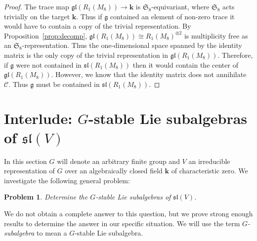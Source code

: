 \documentclass{amsart}
\newtheorem{proposition}[theorem]{Proposition}
\newtheorem{problem}[theorem]{Problem}
\theoremstyle{definition}
\theoremstyle{remark}
\DeclareMathOperator{\End}{End}
\def\SS{\mathfrak{S}}
\def\fieldk{\mathbf{k}}
\def\cubic{\mathcal{C}}
\let\mf\mathfrak
\begin{document}
\begin{proof}
The trace map $\mf{gl}(R_1(M_8)) \to \fieldk$ is $\SS_8$-equivariant, where $\SS_8$ acts trivially on the target
$\fieldk$.  Thus if $\mf{g}$ contained an element of non-zero trace it would have to contain a copy of the trivial
representation.  By Proposition~\ref{prop:decomp}, $\mf{gl}(R_1(M_8)) \cong R_1(M_8)^{\otimes 2}$ is multiplicity free
as an $\SS_8$-representation.  Thus the one-dimensional space spanned by the identity matrix is the only copy of the
trivial representation in $\mf{gl}(R_1(M_8))$.  Therefore, if $\mf{g}$ were not contained in $\mf{sl}(R_1(M_8))$ then
it would contain the center of $\mf{gl}(R_1(M_8))$.  However, we know that the identity matrix does not annihilate
$\cubic$.  Thus $\mf{g}$ must be contained in $\mf{sl}(R_1(M_8))$.
\end{proof}

%
%

\section{Interlude:  $G$-stable Lie subalgebras of $\mf{sl}(V)$}
\label{s-liesub}

In this section $G$ will denote an arbitrary finite group and $V$ an irreducible representation of $G$ over an
algebraically closed field $\fieldk$ of characteristic zero.  We investigate the following general problem:

\begin{problem}
Determine the $G$-stable Lie subalgebras of $\mf{sl}(V)$.
\end{problem}

We do not obtain a complete answer to this question, but we prove strong enough results to determine the answer in our
specific situation. We will use the term \emph{$G$-subalgebra} to mean a $G$-stable Lie subalgebra.
\end{document}
